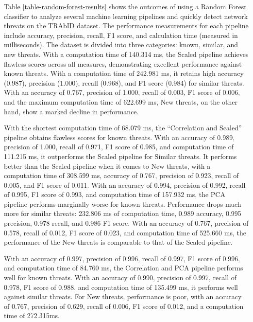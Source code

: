 \documentclass[journal]{IEEEtran}
\begin{document}
Table \ref{table-random-forest-results} shows the outcomes of using a Random Forest classifier to analyze several machine learning pipelines and quickly detect network threats on the TRAbID dataset. The performance measurements for each pipeline include accuracy, precision, recall, F1 score, and calculation time (measured in milliseconds). The dataset is divided into three categories: known, similar, and new threats. With a computation time of 140.314 ms, the Scaled pipeline achieves flawless scores across all measures, demonstrating excellent performance against known threats. With a computation time of 242.981 ms, it retains high accuracy (0.987), precision (1.000), recall (0.968), and F1 score (0.984) for similar threats. With an accuracy of 0.767, precision of 1.000, recall of 0.003, F1 score of 0.006, and the maximum computation time of 622.699 ms, New threats, on the other hand, show a marked decline in performance.



With the shortest computation time of 68.079 ms, the ``Correlation and Scaled'' pipeline obtains flawless scores for known threats. With an accuracy of 0.989, precision of 1.000, recall of 0.971, F1 score of 0.985, and computation time of 111.215 ms, it outperforms the Scaled pipeline for Similar threats. It performs better than the Scaled pipeline when it comes to New threats, with a computation time of 308.599 ms, accuracy of 0.767, precision of 0.923, recall of 0.005, and F1 score of 0.011. With an accuracy of 0.994, precision of 0.992, recall of 0.995, F1 score of 0.993, and computation time of 157.932 ms, the PCA pipeline performs marginally worse for known threats. Performance drops much more for similar threats: 232.806 ms of computation time, 0.989 accuracy, 0.995 precision, 0.978 recall, and 0.986 F1 score. With an accuracy of 0.767, precision of 0.578, recall of 0.012, F1 score of 0.023, and computation time of 525.660 ms, the performance of the New threats is comparable to that of the Scaled pipeline.


With an accuracy of 0.997, precision of 0.996, recall of 0.997, F1 score of 0.996, and computation time of 84.760 ms, the Correlation and PCA pipeline performs well for known threats. With an accuracy of 0.990, precision of 0.997, recall of 0.978, F1 score of 0.988, and computation time of 135.499 ms, it performs well against similar threats. For New threats, performance is poor, with an accuracy of 0.767, precision of 0.629, recall of 0.006, F1 score of 0.012, and a computation time of 272.315ms. 
\end{document}
